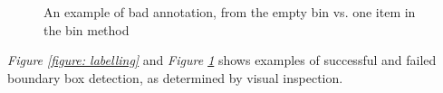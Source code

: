 \begin{figure}[h]
    \centering
    \hspace{0.5cm}
    \hspace{0.5cm}
    \hspace{0.5cm}
    \caption{An example of bad annotation, from the empty bin vs. one item in the bin method}
    \label{figure: badlabelling}
\end{figure}
\textit{Figure \ref{figure: labelling}} and \textit{Figure \ref{figure: badlabelling}} shows examples of successful and failed boundary box detection, as determined by visual inspection. 

\clearpage

